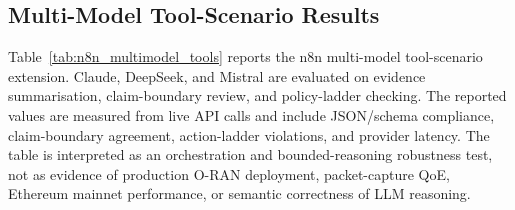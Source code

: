 
\subsection{Multi-Model Tool-Scenario Results}
Table~\ref{tab:n8n_multimodel_tools} reports the n8n multi-model tool-scenario extension. Claude, DeepSeek, and Mistral are evaluated on evidence summarisation, claim-boundary review, and policy-ladder checking. The reported values are measured from live API calls and include JSON/schema compliance, claim-boundary agreement, action-ladder violations, and provider latency. The table is interpreted as an orchestration and bounded-reasoning robustness test, not as evidence of production O-RAN deployment, packet-capture QoE, Ethereum mainnet performance, or semantic correctness of LLM reasoning.


